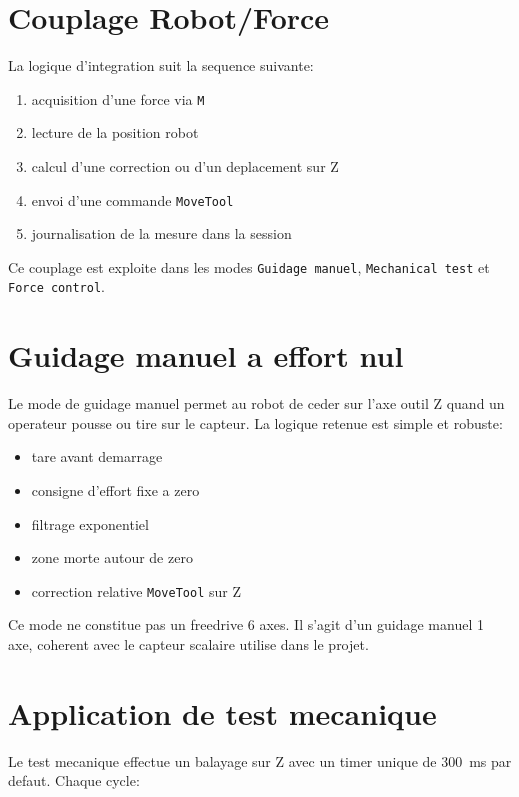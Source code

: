 \documentclass[11pt,a4paper]{article}
\begin{document}
\section{Couplage Robot/Force}

La logique d'integration suit la sequence suivante:

\begin{enumerate}
    \item acquisition d'une force via \texttt{M}
    \item lecture de la position robot
    \item calcul d'une correction ou d'un deplacement sur Z
    \item envoi d'une commande \texttt{MoveTool}
    \item journalisation de la mesure dans la session
\end{enumerate}

Ce couplage est exploite dans les modes \texttt{Guidage manuel}, \texttt{Mechanical test} et \texttt{Force control}.

\section{Guidage manuel a effort nul}

Le mode de guidage manuel permet au robot de ceder sur l'axe outil Z quand un operateur pousse ou tire sur le capteur.
La logique retenue est simple et robuste:

\begin{itemize}
    \item tare avant demarrage
    \item consigne d'effort fixe a zero
    \item filtrage exponentiel
    \item zone morte autour de zero
    \item correction relative \texttt{MoveTool} sur Z
\end{itemize}

Ce mode ne constitue pas un freedrive 6 axes. Il s'agit d'un guidage manuel 1 axe, coherent avec le capteur scalaire utilise dans le projet.

\section{Application de test mecanique}

Le test mecanique effectue un balayage sur Z avec un timer unique de 300~ms par defaut.
Chaque cycle:
\end{document}
